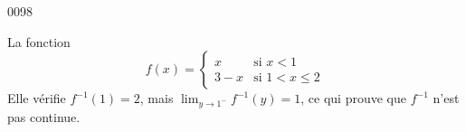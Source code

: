 
\begin{corrige}{0098}

La fonction 
\begin{equation}
	f(x)=\begin{cases}
	x	&	\text{si }x<1\\
	3-x	&	 \text{si }1<x\leq2
\end{cases}
\end{equation}
Elle vérifie $f^{-1}(1)=2$, mais $\lim_{y\to 1^-}f^{-1}(y)=1$, ce qui prouve que $f^{-1}$ n'est pas continue.

\end{corrige}
